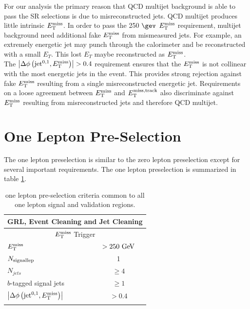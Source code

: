 \indent For our analysis the primary reason that QCD multijet background is able to pass the SR selections is due to misreconstructed jets.  QCD multijet produces little intrinsic $E_{\mathrm{T}}^{\mathrm{miss}}$.  In order to pass the 250 $\gev$ $E_{\mathrm{T}}^{\mathrm{miss}}$ requirement, multijet background need additional fake $E_{\mathrm{T}}^{\mathrm{miss}}$ from mismeasured jets.  For example, an extremely energetic jet may punch through the calorimeter and be reconstructed with a small $E_T$.  This lost $E_T$ maybe reconstructed as $E_{\mathrm{T}}^{\mathrm{miss}}$.  \\

\indent The $\left|\Delta\phi\left(\mathrm{jet}^{0,1},E_{\mathrm{T}}^{\mathrm{miss}}\right)\right| > 0.4$ requirement ensures that the $E_{\mathrm{T}}^{\mathrm{miss}}$ is not collinear with the most energetic jets in the event.  This provides strong rejection against fake $E_{\mathrm{T}}^{\mathrm{miss}}$ resulting from a single misreconstructed energetic jet.  Requirements on a loose agreement between $E_{\mathrm{T}}^{\mathrm{miss}}$ and $E_{\mathrm{T}}^{\mathrm{miss, track}}$ also discriminate against $E_{\mathrm{T}}^{\mathrm{miss}}$ resulting from misreconstructed jets and therefore QCD multijet. \\

\section{One Lepton Pre-Selection}

\indent The one lepton preselection is similar to the zero lepton preselection except for several important requirements.  The one lepton preselection is summarized in table \ref{tab:1Lcommon}. \\

\begin{table}[htbp]
  \begin{center}
    \begin{tabular}{l|c} \hline\hline
      \multicolumn{2}{c}{GRL, Event Cleaning and Jet Cleaning} \\ \hline
      \multicolumn{2}{c}{$E_{\mathrm{T}}^{\mathrm{miss}}$ Trigger} \\ \hline
      $E_{\mathrm{T}}^{\mathrm{miss}}$ & $> 250\GeV$ \\ \hline
      $N_{\rm{signal lep}}$ & 1 \\ \hline
    $N_{jets}$ & $\ge 4$ \\ \hline
      $b$-tagged signal jets & $\ge1$ \\ \hline
      $\left|\Delta\phi\left(\mathrm{jet}^{0,1},E_{\mathrm{T}}^{\mathrm{miss}}\right)\right|$ & $> 0.4$ \\
              & \\ [-2.5ex] \hline
    \end{tabular}
  \caption{ one lepton pre-selection criteria common to all one lepton signal and validation regions.}
  \end{center}
  \label{tab:1Lcommon}
\end{table}

